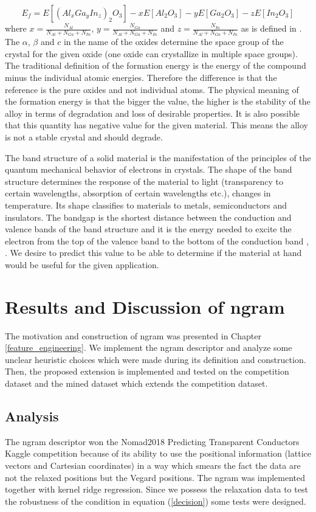 \documentclass[11pt,oneside,czech,american]{book} %
\theoremstyle{definition} %
\theoremstyle{definition}
\begin{document}
\begin{equation}
	E_f = E[(Al_{x}Ga_{y}In_{z})_2 O_3] - xE[Al_2 O_3] - yE[Ga_2 O_3] - zE[In_2 O_3] 
	\label{formation}
\end{equation}
where $x = \frac{N_{Al}}{N_{Al}+N_{Ga}+N_{In}}$, $y = \frac{N_{Ga}}{N_{Al}+N_{Ga}+N_{In}}$ and $z = \frac{N_{In}}{N_{Al}+N_{Ga}+N_{In}}$ as is defined in \parencite{sutton19}. The $\alpha$, $\beta$ and $c$ in the name of the oxides determine the space group of the crystal for the given oxide (one oxide can crystallize in multiple space groups). The traditional definition of the formation energy is the energy of the compound minus the individual atomic energies. Therefore the difference is that the reference is the pure oxides and not individual atoms. The physical meaning of the formation energy is that the bigger the value, the higher is the stability of the alloy in terms of degradation and loss of desirable properties. It is also possible that this quantity has negative value for the given material. This means the alloy is not a stable crystal and should degrade.

The band structure of a solid material is the manifestation of the principles of the quantum mechanical behavior of electrons in crystals. The shape of the band structure determines the response of the material to light (transparency to certain wavelengths, absorption of certain wavelengths etc.), changes in temperature. Its shape classifies to materials to metals, semiconductors and insulators. The bandgap is the shortest distance between the conduction and valence bands of the band structure and it is the energy needed to excite the electron from the top of the valence band to the bottom of the conduction band \parencite{sutton19}, \parencite{kraus16}. We desire to predict this value to be able to determine if the material at hand would be useful for the given application.

\section{Results and Discussion of ngram}
The motivation and construction of ngram was presented in Chapter \ref{feature_engineering}. We implement the ngram descriptor and analyze some unclear heuristic choices which were made during its definition and construction. Then, the proposed extension is implemented and tested on the competition dataset and the mined dataset which extends the competition dataset.

\subsection{Analysis}
The ngram descriptor won the Nomad2018 Predicting Transparent Conductors Kaggle competition because of its ability to use the positional information (lattice vectors and Cartesian coordinates) in a way which smears the fact the data are not the relaxed positions but the Vegard positions. The ngram was implemented together with kernel ridge regression. Since we possess the relaxation data to test the robustness of the condition in equation (\ref{decision}) some tests were designed.
\end{document}
